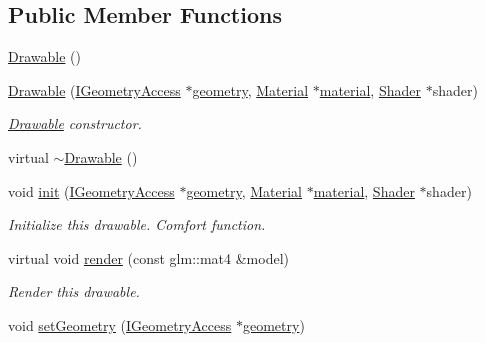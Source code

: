 \subsection*{Public Member Functions}
\begin{DoxyCompactItemize}
\item 
\mbox{\hyperlink{classec_1_1_drawable_adb3c4e7b4d3d510489a26b3d1a8094a2}{Drawable}} ()
\item 
\mbox{\hyperlink{classec_1_1_drawable_a1a6fee8a6543e001ee2943bda72e17cd}{Drawable}} (\mbox{\hyperlink{classec_1_1_i_geometry_access}{I\+Geometry\+Access}} $\ast$\mbox{\hyperlink{_resource_type_8h_af12fe3e5d8da3d7bd4c76e44cca2319c}{geometry}}, \mbox{\hyperlink{classec_1_1_material}{Material}} $\ast$\mbox{\hyperlink{_resource_type_8h_a16f6cac2c88eef38bdba4f004e042542}{material}}, \mbox{\hyperlink{classec_1_1_shader}{Shader}} $\ast$shader)
\begin{DoxyCompactList}\small\item\em \mbox{\hyperlink{classec_1_1_drawable}{Drawable}} constructor. \end{DoxyCompactList}\item 
virtual \mbox{\hyperlink{classec_1_1_drawable_a4a82e5cd6d6a47ad86ed42cfdda512d8}{$\sim$\+Drawable}} ()
\item 
void \mbox{\hyperlink{classec_1_1_drawable_ac494c72b1b0396dbe25a822da4e328a9}{init}} (\mbox{\hyperlink{classec_1_1_i_geometry_access}{I\+Geometry\+Access}} $\ast$\mbox{\hyperlink{_resource_type_8h_af12fe3e5d8da3d7bd4c76e44cca2319c}{geometry}}, \mbox{\hyperlink{classec_1_1_material}{Material}} $\ast$\mbox{\hyperlink{_resource_type_8h_a16f6cac2c88eef38bdba4f004e042542}{material}}, \mbox{\hyperlink{classec_1_1_shader}{Shader}} $\ast$shader)
\begin{DoxyCompactList}\small\item\em Initialize this drawable. Comfort function. \end{DoxyCompactList}\item 
virtual void \mbox{\hyperlink{classec_1_1_drawable_ac9d3345bd308fce8c99adbfc12c53106}{render}} (const glm\+::mat4 \&model)
\begin{DoxyCompactList}\small\item\em Render this drawable. \end{DoxyCompactList}\item 
void \mbox{\hyperlink{classec_1_1_drawable_a76bcb843ef5ced898724fa79a9b20250}{set\+Geometry}} (\mbox{\hyperlink{classec_1_1_i_geometry_access}{I\+Geometry\+Access}} $\ast$\mbox{\hyperlink{_resource_type_8h_af12fe3e5d8da3d7bd4c76e44cca2319c}{geometry}})

\end{DoxyCompactItemize}
